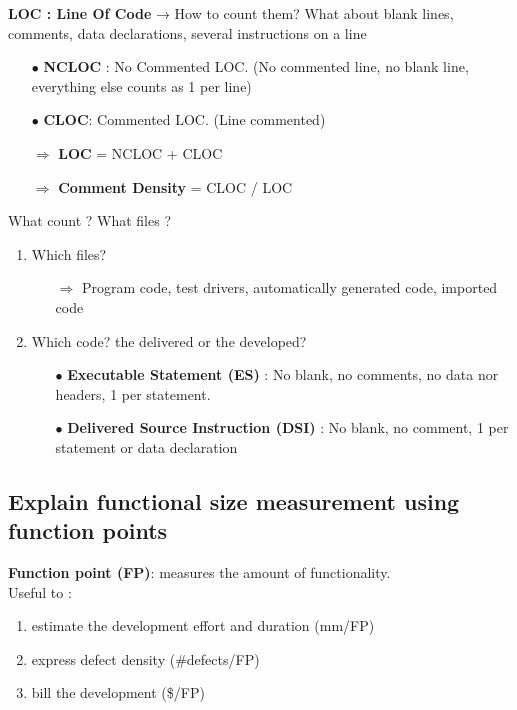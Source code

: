 \documentclass{article}
\begin{document}
\noindent \textbf{LOC : Line Of Code} → How to count them? What about blank lines, comments, data declarations,
several instructions on a line
\begin{itemize}
    \item [$\bullet$]\textbf{NCLOC} : No Commented LOC. (No commented line, no blank line, everything else counts as 1 per line)
    \item [$\bullet$]\textbf{CLOC}: Commented LOC. (Line commented)
    \item [$\Rightarrow$]\textbf{LOC} = NCLOC + CLOC
    \item [$\Rightarrow$]\textbf{Comment Density} = CLOC / LOC\\
\end{itemize}
\noindent What count ? What files ? 
\begin{enumerate}
    \item Which files? 
    \begin{itemize}
        \item [$\Rightarrow$]Program code, test drivers, automatically generated code, imported code
    \end{itemize}
    \item Which code? the delivered or the developed?
    \begin{itemize}
        \item [$\bullet$]\textbf{Executable Statement (ES) }: No blank, no comments, no data nor headers, 1 per statement.

        \item [$\bullet$]\textbf{Delivered Source Instruction (DSI)} : No blank, no comment, 1 per statement or data declaration
    \end{itemize}
\end{enumerate}
\newpage
\subsection{Explain functional size measurement using function points}

\noindent \textbf{Function point (FP)}: measures the amount of functionality.\\
Useful to : 
\begin{enumerate}
    \item estimate the development effort and duration (mm/FP)
    \item express defect density (\#defects/FP)
    \item bill the development (\$/FP)\\
\end{enumerate}
\end{document}
